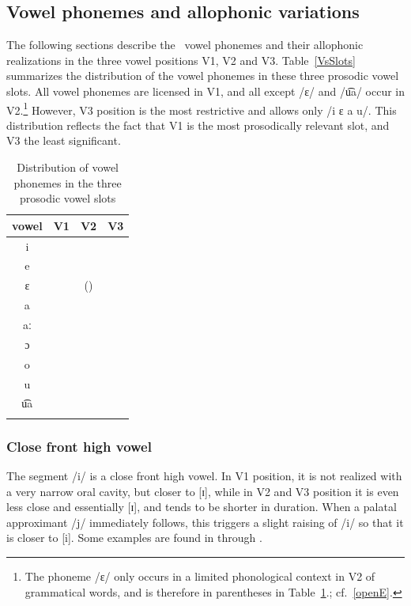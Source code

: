 \subsection{Vowel phonemes and allophonic variations}\label{Vallophones}
The following sections describe the \PS\ vowel phonemes and their allophonic realizations in the three vowel positions V1, V2 and V3. Table~\vref{VsSlots} 
summarizes the distribution of the vowel phonemes in these three prosodic vowel slots.
All vowel phonemes are licensed in V1, and all except /ɛ/ and /u͡a/ occur in V2.\footnote{The phoneme /ɛ/ only occurs in a limited phonological context in V2 of grammatical words, and is therefore in parentheses in Table~\ref{VsSlots}.; cf.~\SEC\ref{openE}.} 
However, V3 position is the most restrictive and allows only /i ɛ a u/. This distribution reflects the fact that V1 is the most prosodically relevant slot, and V3 the least significant.
\begin{table}[ht]\centering
\caption[Distribution of vowel phonemes in the prosodic vowel slots]{Distribution of vowel phonemes in the three prosodic vowel slots}\label{VsSlots}
\begin{tabular}{ c  c  c  c }\mytoprule
{vowel} &{V1}	&{V2}	&{V3}	\\\hline
i	&\PLUS	&\PLUS	&\PLUS	\\
e	&\PLUS	&\PLUS	&\MINUS	\\
ɛ	&\PLUS	&(\MINUS)&\PLUS	\\
a	&\PLUS	&\PLUS	&\PLUS	\\
aː	&\PLUS	&\PLUS	&\MINUS	\\
ɔ	&\PLUS	&\PLUS	&\MINUS	\\
o	&\PLUS	&\PLUS	&\MINUS	\\
u	&\PLUS	&\PLUS	&\PLUS	\\
u͡a	&\PLUS	&\MINUS	&\MINUS	\\\mybottomrule
\end{tabular}
\end{table}


\subsubsection{Close front high vowel}
The segment /i/ is a close front high vowel. In V1 position, it is not realized with a very narrow oral cavity, but closer to [ɪ], while in V2 and V3 position it is even less close and essentially [ɪ], and tends to be shorter in duration. When a palatal approximant /j/ immediately follows, this triggers a slight raising of /i/ so that it is closer to [i]. 
Some examples are found in  through .


